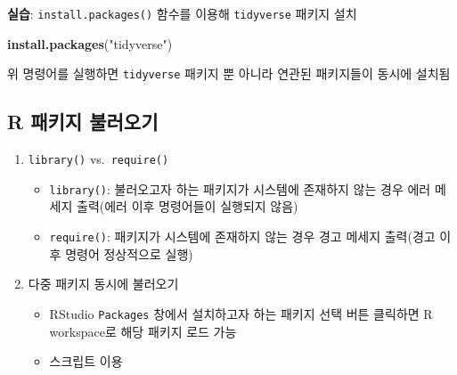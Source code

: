 \documentclass[
  11pt,
]{krantz}
\makeatletter
\newenvironment{Shaded}{\begin{snugshade}}{\end{snugshade}}
\newcommand{\KeywordTok}[1]{\textcolor[rgb]{0.27,0.27,0.27}{\textbf{#1}}}
\newcommand{\NormalTok}[1]{#1}
\newcommand{\StringTok}[1]{\textcolor[rgb]{0.5,0.5,0.5}{#1}}
\providecommand{\tightlist}{%
  \setlength{\itemsep}{0pt}\setlength{\parskip}{0pt}}
\newenvironment{kframe}{%
\medskip{}
\setlength{\fboxsep}{.8em}
 \def\at@end@of@kframe{}%
 \ifinner\ifhmode%
  \def\at@end@of@kframe{\end{minipage}}%
  \begin{minipage}{\columnwidth}%
 \fi\fi%
 \def\FrameCommand##1{\hskip\@totalleftmargin \hskip-\fboxsep
 \colorbox{shadecolor}{##1}\hskip-\fboxsep
     \hskip-\linewidth \hskip-\@totalleftmargin \hskip\columnwidth}%
 \MakeFramed {\advance\hsize-\width
   \@totalleftmargin\z@ \linewidth\hsize
   \@setminipage}}%
 {\par\unskip\endMakeFramed%
 \at@end@of@kframe}
\newenvironment{rmdblock}[1]
  {
  \begin{itemize}
  \renewcommand{\labelitemi}{
    \raisebox{-.7\height}[0pt][0pt]{
      {\setkeys{Gin}{width=3em,keepaspectratio}\texttt{[image: images/\#1]}}
    }
  }
  \setlength{\fboxsep}{1em}
  \begin{kframe}
  \item
  }
  {
  \end{kframe}
  \end{itemize}
  }
\newenvironment{rmdimportant}
  {\begin{rmdblock}{important}}
  {\end{rmdblock}}
\renewenvironment{quote}{\begin{kframe}}{\end{kframe}}
\makeatother
\begin{document}
\footnotesize

\begin{rmdimportant}
\begin{rmdimportant}

\textbf{실습}: \texttt{install.packages()} 함수를 이용해 \texttt{tidyverse} 패키지 설치

\end{rmdimportant}
\end{rmdimportant}

\normalsize

\footnotesize

\begin{Shaded}
\begin{Highlighting}[]
\KeywordTok{install.packages}\NormalTok{(}\StringTok{"tidyverse"}\NormalTok{)}
\end{Highlighting}
\end{Shaded}

\normalsize

\begin{quote}
위 명령어를 실행하면 \texttt{tidyverse} 패키지 뿐 아니라 연관된 패키지들이 동시에 설치됨
\end{quote}

\hypertarget{r-package-load}{%
\subsection{R 패키지 불러오기}\label{r-package-load}}

\begin{enumerate}
\def\labelenumi{\arabic{enumi}.}
\tightlist
\item
  \texttt{library()} vs.~\texttt{require()}

  \begin{itemize}
  \tightlist
  \item
    \texttt{library()}: 불러오고자 하는 패키지가 시스템에 존재하지 않는 경우 에러 메세지 출력(에러 이후 명령어들이 실행되지 않음)
  \item
    \texttt{require()}: 패키지가 시스템에 존재하지 않는 경우 경고 메세지 출력(경고 이후 명령어 정상적으로 실행)
  \end{itemize}
\item
  다중 패키지 동시에 불러오기

  \begin{itemize}
  \tightlist
  \item
    RStudio \texttt{Packages} 창에서 설치하고자 하는 패키지 선택 버튼 클릭하면 R workspace로 해당 패키지 로드 가능
  \item
    스크립트 이용
  \end{itemize}
\end{enumerate}
\end{document}
